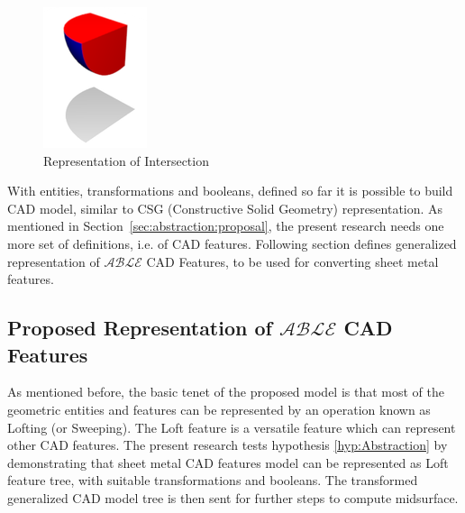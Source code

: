 \begin{itemize}[noitemsep,topsep=2pt,parsep=2pt,partopsep=2pt]

\begin{figure}[!h]
\centering 
\includegraphics[width=0.23\linewidth]{../Common/images/wikiintersect} 
\caption{Representation of Intersection}
\label{fig:abstraction:hodaintersect}
\end{figure}


\end{itemize}

With entities, transformations and booleans, defined so far it is possible to build CAD model, similar to CSG (Constructive Solid Geometry) representation. As mentioned in Section~\ref{sec:abstraction:proposal}, the present research needs one more set of definitions, i.e. of CAD features. Following section defines generalized representation of $\mathcal{ABLE}$ CAD Features, to be used for converting sheet metal features.

\subsection{Proposed Representation of $\mathcal{ABLE}$ CAD Features}

As mentioned before, the basic tenet of the proposed model is that most of the geometric entities and features can be represented by an operation known as Lofting (or Sweeping). 
The Loft feature is a versatile feature which can represent other CAD features. The present research tests hypothesis \ref{hyp:Abstraction} by demonstrating that sheet metal CAD features model can be represented as Loft feature tree, with suitable transformations and booleans. The transformed generalized CAD model tree is then sent for further steps to compute midsurface.




